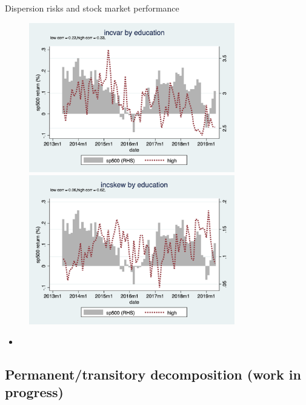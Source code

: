 \documentclass{beamer}
\begin{document}
\begin{frame}{Dispersion risks and stock market performance}
	\begin{figure}
		\centering
		\label{ts_stk_edu_g}
		\includegraphics[width=0.8\textwidth, height=\0.4\textheight]{figures/ts_incvar_edu_g_mean_stk} \\
			\includegraphics[width=0.8\textwidth, height=\0.4\textheight]{figures/ts_incskew_edu_g_mean_stk} 
	\end{figure}
	\begin{itemize}
		\item 
	\end{itemize}
\end{frame}


\subsection{Permanent/transitory decomposition (work in progress)}
\end{document}
